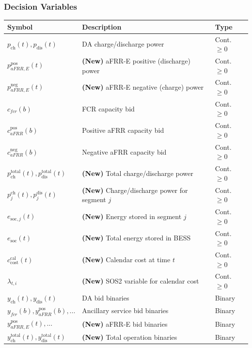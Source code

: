 \documentclass[11pt, a4paper]{article}
\begin{document}
\subsubsection{Decision Variables}
\begin{tabular}{@{}lll}
\toprule
Symbol & Description & Type \\
\midrule
$p_{\mathrm{ch}}(t), p_{\mathrm{dis}}(t)$ & DA charge/discharge power & Cont. $\ge 0$ \\
$p^{\mathrm{pos}}_{aFRR,E}(t)$ & \textbf{(New)} aFRR-E positive (discharge) power & Cont. $\ge 0$ \\
$p^{\mathrm{neg}}_{aFRR,E}(t)$ & \textbf{(New)} aFRR-E negative (charge) power & Cont. $\ge 0$ \\
$c_{fcr}(b)$ & FCR capacity bid & Cont. $\ge 0$ \\
$c^{\mathrm{pos}}_{aFRR}(b)$ & Positive aFRR capacity bid & Cont. $\ge 0$ \\
$c^{\mathrm{neg}}_{aFRR}(b)$ & Negative aFRR capacity bid & Cont. $\ge 0$ \\
$p^{\mathrm{total}}_{\mathrm{ch}}(t), p^{\mathrm{total}}_{\mathrm{dis}}(t)$ & \textbf{(New)} Total charge/discharge power & Cont. $\ge 0$ \\
$p^{\mathrm{ch}}_{j}(t), p^{\mathrm{dis}}_{j}(t)$ & \textbf{(New)} Charge/discharge power for segment $j$ & Cont. $\ge 0$ \\
$e_{\mathrm{soc},j}(t)$ & \textbf{(New)} Energy stored in segment $j$ & Cont. $\ge 0$ \\
$e_{\mathrm{soc}}(t)$ & \textbf{(New)} Total energy stored in BESS & Cont. $\ge 0$ \\
$c^{\mathrm{cal}}_{\mathrm{cost}}(t)$ & \textbf{(New)} Calendar cost at time $t$ & Cont. $\ge 0$ \\
$\lambda_{t,i}$ & \textbf{(New)} SOS2 variable for calendar cost & Cont. $\ge 0$ \\
$y_{\mathrm{ch}}(t), y_{\mathrm{dis}}(t)$ & DA bid binaries & Binary \\
$y_{fcr}(b), y^{\mathrm{pos}}_{aFRR}(b), ...$ & Ancillary service bid binaries & Binary \\
$y^{\mathrm{pos}}_{aFRR,E}(t), ...$ & \textbf{(New)} aFRR-E bid binaries & Binary \\
$y^{\mathrm{total}}_{\mathrm{ch}}(t), y^{\mathrm{total}}_{\mathrm{dis}}(t)$ & \textbf{(New)} Total operation binaries & Binary \\
\bottomrule
\end{tabular}
\end{document}
